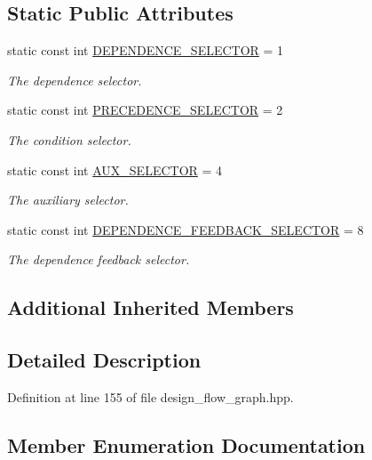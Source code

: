 \subsection*{Static Public Attributes}
\begin{DoxyCompactItemize}
\item 
static const int \hyperlink{classDesignFlowGraph_a2aab30802367c93591da91872908d0d3}{D\+E\+P\+E\+N\+D\+E\+N\+C\+E\+\_\+\+S\+E\+L\+E\+C\+T\+OR} = 1
\begin{DoxyCompactList}\small\item\em The dependence selector. \end{DoxyCompactList}\item 
static const int \hyperlink{classDesignFlowGraph_abfaee97fab8108e75a99de29d463a1a3}{P\+R\+E\+C\+E\+D\+E\+N\+C\+E\+\_\+\+S\+E\+L\+E\+C\+T\+OR} = 2
\begin{DoxyCompactList}\small\item\em The condition selector. \end{DoxyCompactList}\item 
static const int \hyperlink{classDesignFlowGraph_a5a0d19133766cd128c8430309bbd2ec1}{A\+U\+X\+\_\+\+S\+E\+L\+E\+C\+T\+OR} = 4
\begin{DoxyCompactList}\small\item\em The auxiliary selector. \end{DoxyCompactList}\item 
static const int \hyperlink{classDesignFlowGraph_a4e5d0b54b000f53ab61d687943dfa89b}{D\+E\+P\+E\+N\+D\+E\+N\+C\+E\+\_\+\+F\+E\+E\+D\+B\+A\+C\+K\+\_\+\+S\+E\+L\+E\+C\+T\+OR} = 8
\begin{DoxyCompactList}\small\item\em The dependence feedback selector. \end{DoxyCompactList}\end{DoxyCompactItemize}
\subsection*{Additional Inherited Members}


\subsection{Detailed Description}


Definition at line 155 of file design\+\_\+flow\+\_\+graph.\+hpp.



\subsection{Member Enumeration Documentation}
\mbox{\label{classDesignFlowGraph_ab90f4a312dc3eaa9d6df290bb9b2848b}} 
